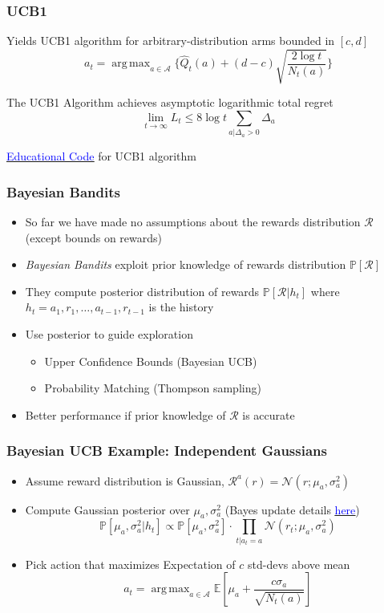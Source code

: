 \documentclass[handout]{beamer}
\DeclareMathOperator*{\argmax}{arg\,max}
\begin{document}
\begin{frame}
\frametitle{UCB1}
\pause
Yields UCB1 algorithm for arbitrary-distribution arms bounded in $[c,d]$
$$a_t = \argmax_{a\in \mathcal{A}} \{ \hat{Q}_t(a) + (d-c)\sqrt{\frac {2 \log t} {N_t(a)}} \}$$
\begin{theorem}
The UCB1 Algorithm achieves asymptotic logarithmic total regret
$$\lim_{t\rightarrow \infty} L_t \leq 8 \log t \sum_{a|\Delta_a > 0} \Delta_a$$
\end{theorem}
\href{https://github.com/coverdrive/MDP-DP-RL/blob/master/src/algorithms/mab/ucb1.py}{\underline{\textcolor{blue}{Educational Code}}} for UCB1 algorithm
\end{frame}

\begin{frame}
\frametitle{Bayesian Bandits}
\pause
\begin{itemize}
\item So far we have made no assumptions about the rewards distribution $\mathcal{R}$ (except bounds on rewards)
\item {\em Bayesian Bandits} exploit prior knowledge of rewards distribution $\mathbb{P}[\mathcal{R}]$
\item They compute posterior distribution of rewards $\mathbb{P}[\mathcal{R}|h_t]$ where $h_t = a_1,r_1, \ldots, a_{t-1}, r_{t-1}$ is the history
\item Use posterior to guide exploration
\begin{itemize}
\item Upper Confidence Bounds (Bayesian UCB)
\item Probability Matching (Thompson sampling)
\end{itemize}
\item Better performance if prior knowledge of $\mathcal{R}$ is accurate
\end{itemize}
\end{frame}

\begin{frame}
\frametitle{Bayesian UCB Example: Independent Gaussians}
\pause
\begin{itemize}[<+->]
\item Assume reward distribution is Gaussian, $\mathcal{R}^a(r) =\mathcal{N}(r;\mu_a, \sigma_a^2)$
\item Compute Gaussian posterior over $\mu_a,\sigma_a^2$  (Bayes update details \href{https://people.eecs.berkeley.edu/~jordan/courses/260-spring10/lectures/lecture5.pdf}{\underline{\textcolor{blue}{here}}})
$$\mathbb{P}[\mu_a, \sigma_a^2|h_t] \propto \mathbb{P}[\mu_a, \sigma_a^2] \cdot \prod_{t|a_t=a} \mathcal{N}(r_t;\mu_a, \sigma_a^2)$$
\item Pick action that maximizes Expectation of $c$ std-devs above mean
$$a_t = \argmax_{a\in\mathcal{A}} \mathbb{E}[\mu_a + \frac {c \sigma_a} {\sqrt{N_t(a)}}]$$
\end{itemize}
\end{frame}
\end{document}
